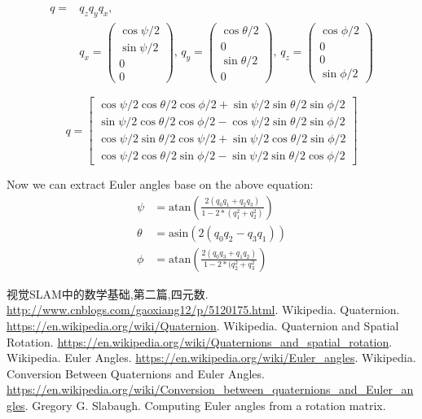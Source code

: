 \documentclass{article}
\begin{document}
\begin{displaymath}
\begin{split}
  q =& q_zq_yq_x, \\
  &q_x = \begin{pmatrix} \cos{\psi/2} \\
  \sin{\psi/2} \\ 0 \\ 0 \end{pmatrix}, \,
  q_y = \begin{pmatrix} \cos{\theta/2} \\
  0 \\ \sin{\theta/2} \\ 0 \end{pmatrix}, \,
  q_z = \begin{pmatrix} \cos{\phi/2} \\
  0 \\ 0 \\ \sin{\phi/2} \end{pmatrix}
\end{split}
\end{displaymath}

\begin{equation}
  q = \begin{bmatrix}
    \cos{\psi/2}\cos{\theta/2}\cos{\phi/2}+\sin{\psi/2}\sin{\theta/2}\sin{\phi/2} \\
    \sin{\psi/2}\cos{\theta/2}\cos{\phi/2}-\cos{\psi/2}\sin{\theta/2}\sin{\phi/2} \\
    \cos{\psi/2}\sin{\theta/2}\cos{\psi/2}+\sin{\psi/2}\cos{\theta/2}\sin{\phi/2} \\
    \cos{\psi/2}\cos{\theta/2}\sin{\phi/2}-\sin{\psi/2}\sin{\theta/2}\cos{\phi/2}
  \end{bmatrix}
\end{equation}

Now we can extract Euler angles base on the above equation:
\begin{equation}
\begin{aligned}
  \psi   &= \text{atan}\left(\frac{2(q_0q_1+q_2q_3)}{1-2*(q_1^2+q_2^2)}\right) \\
  \theta &= \text{asin}\left(2(q_0q_2-q_3q_1) \right)                   \\
  \phi   &= \text{atan}\left(\frac{2(q_0q_3+q_1q_2)}{1-2*(q_2^2+q_3^2}\right)
\end{aligned}
\end{equation}

\begin{thebibliography}{99}
 视觉SLAM中的数学基础,第二篇,四元数. \url{http://www.cnblogs.com/gaoxiang12/p/5120175.html}.
 Wikipedia. Quaternion. \url{https://en.wikipedia.org/wiki/Quaternion}.
 Wikipedia. Quaternion and Spatial Rotation. \url{https://en.wikipedia.org/wiki/Quaternions_and_spatial_rotation}.
 Wikipedia. Euler Angles. \url{https://en.wikipedia.org/wiki/Euler_angles}.
 Wikipedia. Conversion Between Quaternions and Euler Angles. \url{https://en.wikipedia.org/wiki/Conversion_between_quaternions_and_Euler_angles}.
 Gregory G. Slabaugh. Computing Euler angles from a rotation matrix.
\end{thebibliography}
\end{document}
